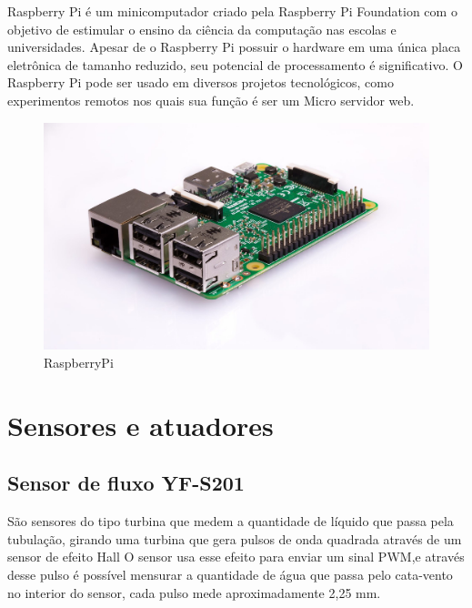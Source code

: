 Raspberry Pi é um minicomputador criado pela Raspberry Pi Foundation com o objetivo de estimular o ensino da ciência da computação nas escolas e universidades. Apesar de o Raspberry Pi possuir o hardware em uma única placa eletrônica de tamanho reduzido, seu potencial de processamento é significativo. O Raspberry Pi pode ser usado em diversos projetos tecnológicos, como experimentos remotos nos quais sua função é ser um Micro servidor web.\cite{crotti2013raspberrypi}

\begin{figure}[htbp]
		\centering
		\includegraphics[scale=0.2]{figuras/raspberrypi.jpg}
		\caption{RaspberryPi}
		\label{fig:02}
\end{figure}

\section{Sensores e atuadores}

\subsection{Sensor de fluxo YF-S201}

São sensores do tipo turbina que medem a quantidade de líquido que passa pela tubulação, girando uma turbina que
gera pulsos de onda quadrada através de um sensor de efeito Hall\cite{roque2018sistema} O
sensor usa esse efeito para enviar um sinal PWM,e através desse pulso é possível mensurar a quantidade de água que passa pelo cata-vento no interior do sensor, cada pulso mede aproximadamente 2,25 mm.\cite{ms2017automaccao}

